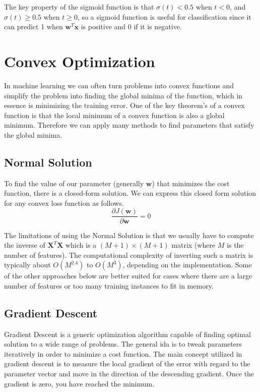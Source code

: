 \documentclass[12pt]{article}
\begin{document}
        The key property of the sigmoid function is that $\sigma(t) < 0.5$ when $t < 0$, and $\sigma(t) \geq 0.5$ when $t \geq 0$, so a sigmoid function is useful for classification since it can predict 1 when $\boldsymbol{w}^T\boldsymbol{x}$
        is positive and 0 if it is negative.

\section{Convex Optimization}
    In machine learning we can often turn problems into convex functions and simplify the problem into finding the global minima of the function, which in essence is minimizing the training error. One of the key theorem's of a convex function is 
    that the local minimum of a convex function is also a global minimum. Therefore we can apply many methods to find parameters that satisfy the global minima.

    \subsection{Normal Solution}
        To find the value of our parameter (generally $\boldsymbol{w}$) that minimizes the cost function, there is a closed-form solution. We can express this closed form solution for any convex loss function as follows.
        $$ \frac{\partial J(\boldsymbol{w})}{\partial \boldsymbol{w}} = 0 $$
        
        The limitations of using the Normal Solution is that we usually have to compute the inverse of $\boldsymbol{X}^T\boldsymbol{X}$ which is a $(M+1) \times (M+1)$ matrix (where $M$ is the number of features). The computational complexity of inverting 
        such a matrix is typically about $O(M^{2.4})$ to $O(M^{3})$, depending on the implementation. Some of the other approaches below are better suited for cases where there are a large number of features or too many training instances
        to fit in memory.

    \subsection{Gradient Descent}
        Gradient Descent is a generic optimization algorithm capable of finding optimal solution to a wide range of problems. The general ida is to tweak parameters iteratively in order to minimize a cost function. The main concept utilized in
        gradient descent is to measure the local gradient of the error with regard to the parameter vector and move in the direction of the descending gradient. Once the gradient is zero, you have reached the minimum.
\end{document}
